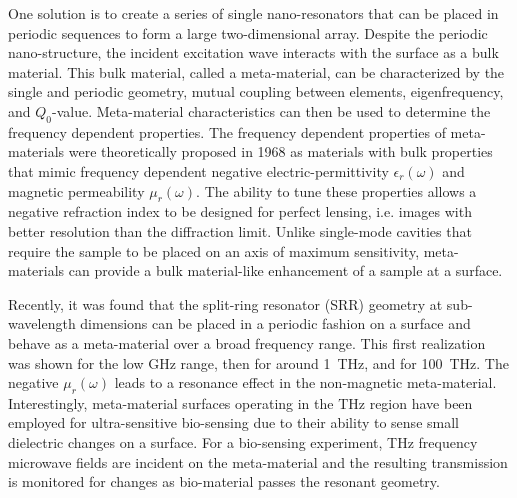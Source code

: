 One solution is to create a series of single nano-resonators that can be placed in periodic sequences to form a large two-dimensional array. Despite the periodic nano-structure, the incident excitation wave interacts with the surface as a bulk material. \cite{Yen04} This bulk material, called a meta-material, can be characterized by the single and periodic geometry, mutual coupling between elements, eigenfrequency, and $Q_0$-value. Meta-material characteristics can then be used to determine the frequency dependent properties. The frequency dependent properties of meta-materials were theoretically proposed in 1968 as materials with bulk properties that mimic frequency dependent negative electric-permittivity $\epsilon_r(\omega)$ and magnetic permeability $\mu_r(\omega)$. \cite{Veselago68} The ability to tune these properties allows a negative refraction index to be designed for perfect lensing, i.e. images with better resolution than the diffraction limit. \cite{Smith04} Unlike single-mode cavities that require the sample to be placed on an axis of maximum sensitivity, meta-materials can provide a bulk material-like enhancement of a sample at a surface.

Recently, it was found that the split-ring resonator (SRR) geometry at sub-wavelength dimensions can be placed in a periodic fashion on a surface and behave as a meta-material over a broad frequency range. \cite{Smith00,Yen04,Linden04} This first realization was shown for the low GHz range, \cite{Smith00} then for around 1~THz, \cite{Yen04} and for 100~THz. \cite{Linden04} The negative $\mu_r(\omega)$ leads to a resonance effect in the non-magnetic meta-material. Interestingly, meta-material surfaces operating in the THz region have been employed for ultra-sensitive bio-sensing due to their ability to sense small dielectric changes on a surface. \cite{C7NR03824K} For a bio-sensing experiment, THz frequency microwave fields are incident on the meta-material and the resulting transmission is monitored for changes as bio-material passes the resonant geometry. \cite{Lee2017}

